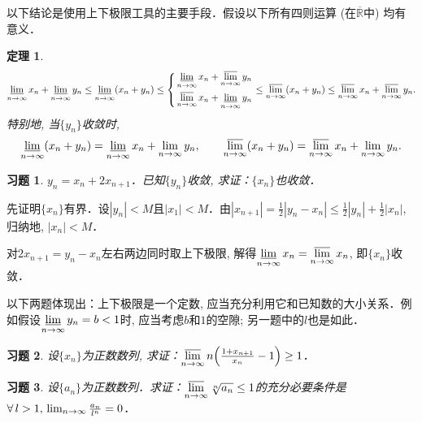 \documentclass[11pt,a4paper]{ctexart}
\makeatletter
\theoremstyle{thmseries} %
\newtheorem{thm}{定理}[section]
\theoremstyle{exerseries}
\newtheorem{exer}{习题}[section]
\renewenvironment{proof}[1][\proofname]{\par
  \pushQED{\qed}%
  \normalfont \topsep6\p@\@plus6\p@\relax
  \trivlist
  \item[\hskip\labelsep
        \itshape
    #1\@addpunct{}]\ignorespaces
}{%
  \popQED\endtrivlist\@endpefalse
}
\newenvironment{pf}{\begin{proof}[\bfseries\upshape 证\quad]}{\end{proof}}
\newcommand{\bra}[1]{\mathopen{}\left(#1\right)}
\newcommand{\cbra}[1]{\mathopen{}\left\{#1\right\}}
\renewcommand{\epsilon}{\varepsilon}
\newcommand{\R}{\mathbb{R}}
\newcommand{\N}{\mathbb{N}}
\def \nti {\mathnormal{n}\to\infty}
\DeclareMathOperator{\llim}{\underset{\nti}{\underline{\lim}}}
\DeclareMathOperator{\ulim}{\underset{\nti}{\overline{\lim}}}
\makeatother
\begin{document}
以下结论是使用上下极限工具的主要手段．假设以下所有四则运算 (在$\overline{\R}$中) 均有意义．
\begin{thm}
	\[\llim x_n+\llim y_n\leq\llim\bra{x_n+y_n}\leq
	\left\{\begin{aligned}
	&\llim x_n+\ulim y_n\\
	&\ulim x_n+\llim y_n\\
	\end{aligned}\right.
	\leq\ulim\bra{x_n+y_n}\leq\ulim x_n+\ulim y_n.\]
	特别地, 当$\{y_n\}$收敛时, 
	\[\llim\bra{x_n+y_n}=\llim x_n+\lim_{\nti} y_n,\qquad\ulim\bra{x_n+y_n}=\ulim x_n+\lim_{\nti} y_n.\]
\end{thm}

\begin{exer}
	$y_n=x_n+2x_{n+1}$．已知$\{y_n\}$收敛, 求证：$\{x_n\}$也收敛．
\end{exer}
\begin{pf}
	先证明$\{x_n\}$有界．设$|y_n|<M$且$|x_1|<M$．由$|x_{n+1}|=\frac{1}{2}|y_n-x_n|\leq\frac{1}{2}|y_n|+\frac{1}{2}|x_n|$, 归纳地, $|x_n|<M$．

	对$2x_{n+1}=y_n-x_n$左右两边同时取上下极限, 解得$\llim x_n=\ulim x_n$, 即$\{x_n\}$收敛．
\end{pf}


以下两题体现出：上下极限是一个定数, 应当充分利用它和已知数的大小关系．例如假设$\llim y_n=b<1$时, 应当考虑$b$和$1$的空隙; 另一题中的$l$也是如此．
\begin{exer}
	设$\{x_n\}$为正数数列, 求证：$\ulim n\bra{\frac{1+x_{n+1}}{x_n}-1}\geq1$．
\end{exer}

\begin{exer}
	设$\{a_n\}$为正数数列．求证：$\ulim \sqrt[n]{a_n}\leq1$的充分必要条件是$\forall\,l>1,\,\lim_{\nti}\frac{a_n}{l^n}=0$．
\end{exer}
\end{document}
